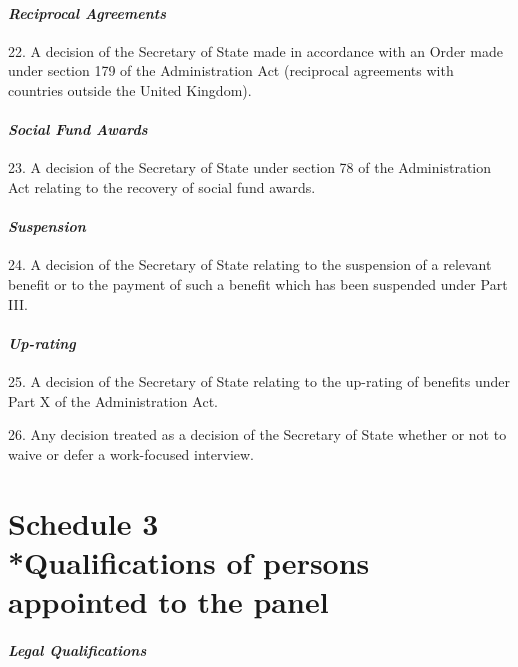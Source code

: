 \documentclass[12pt,a4paper]{article}
\begin{document}
\subsection*{\itshape Reciprocal Agreements}

22.  A decision of the Secretary of State made in accordance with an Order made under section 179 of the Administration Act (reciprocal agreements with countries outside the United Kingdom).

\subsection*{\itshape Social Fund Awards}

23.  A decision of the Secretary of State under section 78 of the Administration Act relating to the recovery of social fund awards.

\subsection*{\itshape Suspension}

24.  A decision of the Secretary of State relating to the suspension of a relevant benefit or to the payment of such a benefit which has been suspended under Part III.

\subsection*{\itshape Up-rating}

25.  A decision of the Secretary of State relating to the up-rating of benefits under Part X of the Administration Act.

26.  Any decision treated as a decision of the Secretary of State whether or not to waive or defer a work-focused interview.


\part[Schedule 3 --- Qualifications of persons appointed to the panel]{Schedule 3\\*Qualifications of persons appointed to the panel}

\subsection*{\itshape Legal Qualifications}
\end{document}
